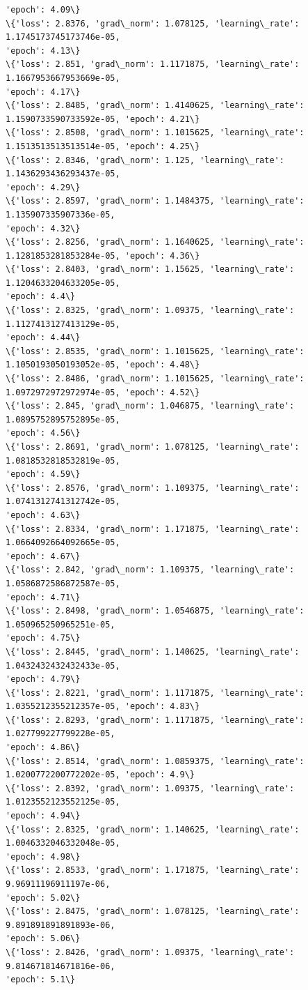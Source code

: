 \documentclass[11pt]{article}
\begin{document}
\begin{Verbatim}[commandchars=\\\{\}]
'epoch': 4.09\}
\{'loss': 2.8376, 'grad\_norm': 1.078125, 'learning\_rate': 1.1745173745173746e-05,
'epoch': 4.13\}
\{'loss': 2.851, 'grad\_norm': 1.1171875, 'learning\_rate': 1.1667953667953669e-05,
'epoch': 4.17\}
\{'loss': 2.8485, 'grad\_norm': 1.4140625, 'learning\_rate':
1.1590733590733592e-05, 'epoch': 4.21\}
\{'loss': 2.8508, 'grad\_norm': 1.1015625, 'learning\_rate':
1.1513513513513514e-05, 'epoch': 4.25\}
\{'loss': 2.8346, 'grad\_norm': 1.125, 'learning\_rate': 1.1436293436293437e-05,
'epoch': 4.29\}
\{'loss': 2.8597, 'grad\_norm': 1.1484375, 'learning\_rate': 1.135907335907336e-05,
'epoch': 4.32\}
\{'loss': 2.8256, 'grad\_norm': 1.1640625, 'learning\_rate':
1.1281853281853284e-05, 'epoch': 4.36\}
\{'loss': 2.8403, 'grad\_norm': 1.15625, 'learning\_rate': 1.1204633204633205e-05,
'epoch': 4.4\}
\{'loss': 2.8325, 'grad\_norm': 1.09375, 'learning\_rate': 1.1127413127413129e-05,
'epoch': 4.44\}
\{'loss': 2.8535, 'grad\_norm': 1.1015625, 'learning\_rate':
1.1050193050193052e-05, 'epoch': 4.48\}
\{'loss': 2.8486, 'grad\_norm': 1.1015625, 'learning\_rate':
1.0972972972972974e-05, 'epoch': 4.52\}
\{'loss': 2.845, 'grad\_norm': 1.046875, 'learning\_rate': 1.0895752895752895e-05,
'epoch': 4.56\}
\{'loss': 2.8691, 'grad\_norm': 1.078125, 'learning\_rate': 1.0818532818532819e-05,
'epoch': 4.59\}
\{'loss': 2.8576, 'grad\_norm': 1.109375, 'learning\_rate': 1.0741312741312742e-05,
'epoch': 4.63\}
\{'loss': 2.8334, 'grad\_norm': 1.171875, 'learning\_rate': 1.0664092664092665e-05,
'epoch': 4.67\}
\{'loss': 2.842, 'grad\_norm': 1.109375, 'learning\_rate': 1.0586872586872587e-05,
'epoch': 4.71\}
\{'loss': 2.8498, 'grad\_norm': 1.0546875, 'learning\_rate': 1.050965250965251e-05,
'epoch': 4.75\}
\{'loss': 2.8445, 'grad\_norm': 1.140625, 'learning\_rate': 1.0432432432432433e-05,
'epoch': 4.79\}
\{'loss': 2.8221, 'grad\_norm': 1.1171875, 'learning\_rate':
1.0355212355212357e-05, 'epoch': 4.83\}
\{'loss': 2.8293, 'grad\_norm': 1.1171875, 'learning\_rate': 1.027799227799228e-05,
'epoch': 4.86\}
\{'loss': 2.8514, 'grad\_norm': 1.0859375, 'learning\_rate':
1.0200772200772202e-05, 'epoch': 4.9\}
\{'loss': 2.8392, 'grad\_norm': 1.09375, 'learning\_rate': 1.0123552123552125e-05,
'epoch': 4.94\}
\{'loss': 2.8325, 'grad\_norm': 1.140625, 'learning\_rate': 1.0046332046332048e-05,
'epoch': 4.98\}
\{'loss': 2.8533, 'grad\_norm': 1.171875, 'learning\_rate': 9.96911196911197e-06,
'epoch': 5.02\}
\{'loss': 2.8475, 'grad\_norm': 1.078125, 'learning\_rate': 9.891891891891893e-06,
'epoch': 5.06\}
\{'loss': 2.8426, 'grad\_norm': 1.09375, 'learning\_rate': 9.814671814671816e-06,
'epoch': 5.1\}

\end{Verbatim}
\end{document}

